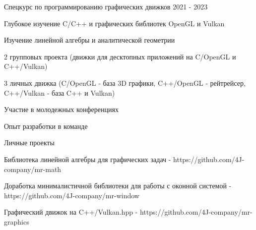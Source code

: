 

\begin{cventries}

  \cventry
    {} %
    {Спецкурс по программированию графических движков} %
    {} %
    {2021 - 2023} %
    {
      \begin{cvitems} %
        \item {Глубокое изучение C/C++ и графических библиотек OpenGL и Vulkan}
        \item {Изучение линейной алгебры и аналитической геометрии}
        \item {2 групповых проекта (движки для десктопных приложений на C/OpenGL и C++/Vulkan)}
        \item {3 личных движка (C/OpenGL ‐ база 3D графики, C++/OpenGL ‐ рейтрейсер, C++/Vulkan ‐ база C++ и Vulkan)}
        \item {Участие в молодежных конференциях}
        \item {Опыт разработки в команде}
      \end{cvitems}
    }

  \cventry
    {} %
    {Личные проекты} %
    {} %
    {} %
    {
      \begin{cvitems} %
        \item {Библиотека линейной алгебры для графических задач - https://github.com/4J-company/mr-math}
        \item {Доработка минималистичной библиотеки для работы с оконной системой - https://github.com/4J-company/mr-window}
        \item {Графический движок на C++/Vulkan.hpp - https://github.com/4J-company/mr-graphics}
      \end{cvitems}
    }

\end{cventries}
